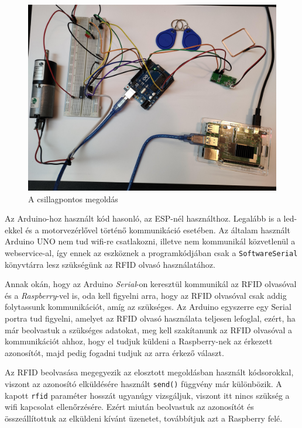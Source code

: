 \documentclass[
]{thesis-ekf}
\theoremstyle{definition}
\theoremstyle{remark}
\begin{document}
\begin{figure}[ht]
\centering
\includegraphics[width=14cm]{csillagpontos}
\caption{A csillagpontos megoldás}
\label{fig:csillagpontos}
\end{figure}


Az Arduino-hoz használt kód hasonló, az ESP-nél használthoz. Legalább is a led-ekkel és a motorvezérlővel történő kommunikáció esetében. Az általam használt Arduino UNO nem tud wifi-re csatlakozni, illetve nem kommunikál közvetlenül a webservice-al, így ennek az eszköznek a programkódjában csak a \texttt{SoftwareSerial} könyvtárra lesz szükségünk az RFID olvasó használatához.

Annak okán, hogy az Arduino \emph{Serial}-on keresztül kommunikál az RFID olvasóval és a \emph{Raspberry}-vel is, oda kell figyelni arra, hogy az RFID olvasóval csak addig folytassunk kommunikációt, amíg az szükséges. Az Arduino egyszerre egy Serial portra tud figyelni, amelyet az RFID olvasó használata teljesen lefoglal, ezért, ha már beolvastuk a szükséges adatokat, meg kell szakítanunk az RFID olvasóval a kommunikációt ahhoz, hogy el tudjuk küldeni a Raspberry-nek az érkezett azonosítót, majd pedig fogadni tudjuk az arra érkező választ.

Az RFID beolvasása megegyezik az elosztott megoldásban használt kódsorokkal, viszont az azonosító elküldésére használt \texttt{send()} függvény már különbözik. A kapott \texttt{rfid} paraméter hosszát ugyanúgy vizsgáljuk, viszont itt nincs szükség a wifi kapcsolat ellenőrzésére. Ezért miután beolvastuk az azonosítót és összeállítottuk az elküldeni kívánt üzenetet, továbbítjuk azt a Raspberry felé.
\end{document}

